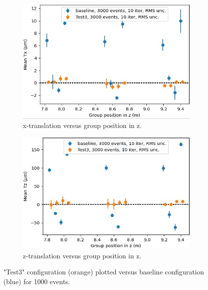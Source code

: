 \begin{figure}
  \centering
  \begin{subfigure}[b]{0.7\textwidth}
    \centering
    \includegraphics[width=\textwidth]{plots/renewed_plots/lxplus/4_10_a.jpeg}
    \caption{x-translation versus group position in z.}
    \label{fig:TxZ_1}
  \end{subfigure}
  \hfill
  \begin{subfigure}[b]{0.7\textwidth}
    \centering
    \includegraphics[width=\textwidth]{plots/renewed_plots/lxplus/4_10_b.jpeg}
    \caption{z-translation versus group position in z.}
    \label{fig:TxZ_2}
  \end{subfigure}
  \caption{"Test3" configuration (orange) plotted versus baseline configuration (blue) for 1000 events.}
  \label{fig:TxZ}
\end{figure}

